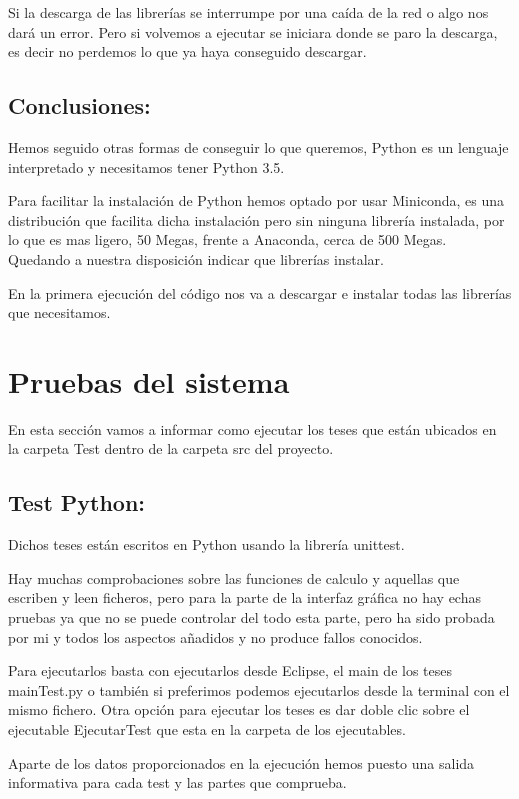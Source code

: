Si la descarga de las librerías se interrumpe por una caída de la red o algo nos dará un error. Pero si volvemos a ejecutar se iniciara donde se paro la descarga, es decir no perdemos lo que ya haya conseguido descargar.


\subsection{Conclusiones:}
Hemos seguido otras formas de conseguir lo que queremos, Python es un lenguaje interpretado y necesitamos tener Python 3.5.

Para facilitar la instalación de Python hemos optado por usar Miniconda, es una distribución que facilita dicha instalación pero sin ninguna librería instalada, por lo que es mas ligero, 50 Megas, frente a Anaconda, cerca de 500 Megas. Quedando a nuestra disposición indicar que librerías instalar.

En la primera ejecución del código nos va a descargar e instalar todas las librerías que necesitamos.

\section{Pruebas del sistema}
En esta sección vamos a informar como ejecutar los teses que están ubicados en la carpeta Test dentro de la carpeta src del proyecto. 

\subsection{Test Python:}
Dichos teses están escritos en Python usando la librería unittest.

Hay muchas comprobaciones sobre las funciones de calculo y aquellas que escriben y leen ficheros, pero para la parte de la interfaz gráfica no hay echas pruebas ya que no se puede controlar del todo esta parte, pero ha sido probada por mi y todos los aspectos añadidos y no produce fallos conocidos.

Para ejecutarlos basta con ejecutarlos desde Eclipse, el main de los teses mainTest.py o también si preferimos podemos ejecutarlos desde la terminal con el mismo fichero.
Otra opción para ejecutar los teses es dar doble clic sobre el ejecutable EjecutarTest que esta en la carpeta de los ejecutables. 

Aparte de los datos proporcionados en la ejecución hemos puesto una salida informativa para cada test y las partes que comprueba.
 
